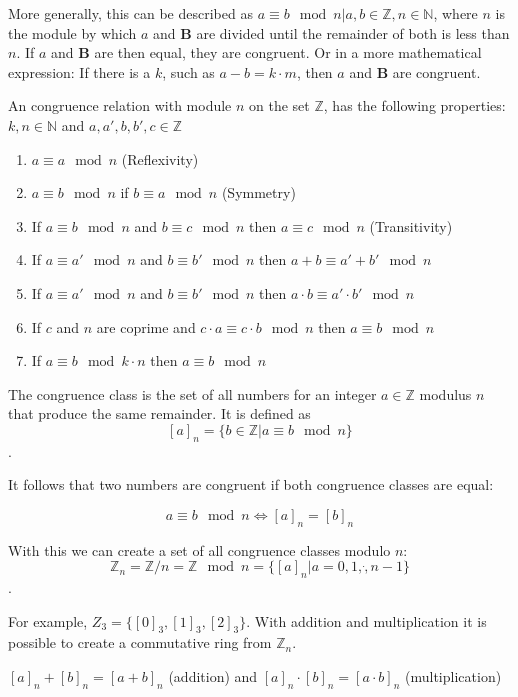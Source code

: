 More generally, this can be described as $a \equiv b \mod n | a,b \in \mathbb{Z}, n \in \mathbb{N}$, where $n$ is the module by which $a$ and $\textbf{B}$ are divided until the remainder of both is less than $n$. If $a$ and $\textbf{B}$ are then equal, they are congruent. Or in a more mathematical expression: If there is a $k$, such as $a-b = k\cdot m$, then $a$ and $\textbf{B}$ are congruent.

An congruence relation with module $n$ on the set $\mathbb{Z}$, has the following properties:
$k,n \in \mathbb{N}$ and $a, a', b, b', c \in \mathbb{Z}$
\begin{enumerate}
  \item $a \equiv a \mod n$ (Reflexivity)
  \item $a \equiv b \mod n$ if $b \equiv a \mod n$ (Symmetry)
  \item If $a \equiv b \mod n$ and $b \equiv c \mod n$ then $a \equiv c \mod n$ (Transitivity)
  \item If $a \equiv a' \mod n$ and $b \equiv b' \mod n$ then $a+b \equiv a'+b' \mod n$
  \item If $a \equiv a' \mod n$ and $b \equiv b' \mod n$ then $a\cdot b \equiv a'\cdot b' \mod n$
  \item If $c$ and $n$ are coprime and $c \cdot a \equiv c \cdot b \mod n$ then $a \equiv b \mod n$
  \item If $a \equiv b \mod k\cdot n$ then $a \equiv b \mod n$
\end{enumerate}

The congruence class is the set of all numbers for an integer $a \in \mathbb{Z}$ modulus $n$ that produce the same remainder. It is defined as
$$[a]_n = \{b \in \mathbb{Z} | a \equiv b \mod n\}$$.

It follows that two numbers are congruent if both congruence classes are equal:

$$a \equiv b \mod n \Leftrightarrow [a]_n = [b]_n$$

With this we can create a set of all congruence classes modulo $n$:
$$\mathbb{Z}_n = \mathbb{Z}/n = \mathbb{Z} \mod n = \{[a]_n | a = 0, 1, \dot, n-1 \}$$.

For example, $Z_3 = \{[0]_3, [1]_3, [2]_3\}$. With addition and multiplication it is possible to create a commutative ring from $\mathbb{Z}_n$.
\begin{center}
  $[a]_n + [b]_n = [a+b]_n$ (addition) and $[a]_n \cdot [b]_n = [a\cdot b]_n$ (multiplication)
\end{center}

